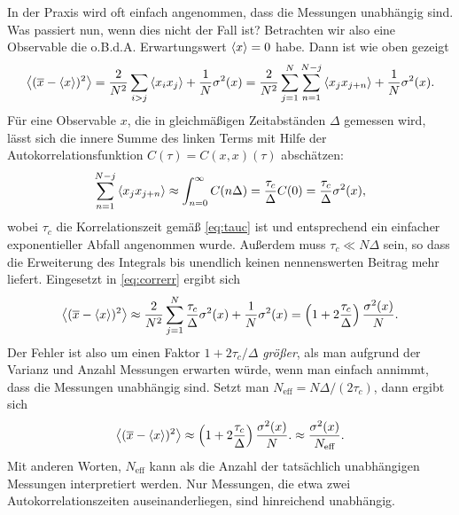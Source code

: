In der Praxis wird oft einfach angenommen, dass die Messungen
unabhängig sind. Was passiert nun, wenn dies nicht der Fall ist?
Betrachten wir also eine Observable die o.B.d.A. Erwartungswert
$\left\langle{x}\right\rangle = 0$ habe. Dann ist wie oben gezeigt
\begin{equation}
  \label{eq:correrr}
  \left\langle{(\overline{x} - \left\langle{x}\right\rangle)^2}\right\rangle = \frac{2}{N^2}\sum_{i > j}
  \left\langle{x_ix_j}\right\rangle
  + \frac{1}{N}\sigma^2(x)
  = \frac{2}{N^2}\sum_{j=1}^{N}\sum_{n = 1}^{N-j} \left\langle{x_jx_{j+n}}\right\rangle
  + \frac{1}{N}\sigma^2(x).
\end{equation}
Für eine Observable $x$, die in gleichmäßigen Zeitabständen $\Delta$
gemessen wird, lässt sich die innere Summe des linken Terms mit Hilfe
der Autokorrelationsfunktion $C(\tau) = C(x,x)(\tau)$
abschätzen:\nobreak
\begin{equation}
  \sum_{n = 1}^{N-j} \left\langle{x_jx_{j+n}}\right\rangle
  \approx \int_{n = 0}^{\infty} C(n\Delta)
  = \frac{\tau_c}{\Delta} C(0)
  = \frac{\tau_c}{\Delta}\sigma^2(x),
\end{equation}
wobei $\tau_c$ die Korrelationszeit gemäß \eqref{eq:tauc} ist und
entsprechend ein einfacher exponentieller Abfall angenommen
wurde. Außerdem muss $\tau_c\ll N\Delta$ sein, so dass die Erweiterung
des Integrals bis unendlich keinen nennenswerten Beitrag mehr
liefert. Eingesetzt in \eqref{eq:correrr} ergibt sich
\begin{equation}
  \label{eq:correrrest}
  \left\langle{(\overline{x} - \left\langle{x}\right\rangle)^2}\right\rangle
  \approx
  \frac{2}{N^2}\sum_{j=1}^{N} \frac{\tau_c}{\Delta}\sigma^2(x)
  + \frac{1}{N}\sigma^2(x)
  =
  \left(1 + 2\frac{\tau_c}{\Delta}\right)\frac{\sigma^2(x)}{N}.
\end{equation}
Der Fehler ist also um einen Faktor $1 + 2 \tau_c /\Delta$
\emph{größer}, als man aufgrund der Varianz und Anzahl Messungen
erwarten würde, wenn man einfach annimmt, dass die Messungen
unabhängig sind. Setzt man $N_\text{eff} = N \Delta / (2\tau_c)$, dann
ergibt sich
\begin{equation}
  \label{eq:errestvarcorr}
  \left\langle{(\overline{x} - \left\langle{x}\right\rangle)^2}\right\rangle
  \approx
  \left(1 + 2\frac{\tau_c}{\Delta}\right)\frac{\sigma^2(x)}{N}.
  \approx \frac{\sigma^2(x)}{N_\text{eff}}.
\end{equation}
Mit anderen Worten, $N_\text{eff}$ kann als die Anzahl der tatsächlich
unabhängigen Messungen interpretiert werden. Nur Messungen, die etwa
zwei Autokorrelationszeiten auseinanderliegen, sind hinreichend
unabhängig.

